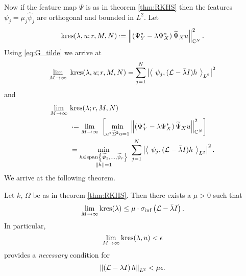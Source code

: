 Now if the feature map $\Psi$ is as in theorem \ref{thm:RKHS} then the features 
$\psi_j = \mu_j \hat{\psi}_j$ are orthogonal and bounded in $L^2$. Let 
\begin{equation}
    \kres (\lambda, u; r, M, N) \defeq 
    \left\| \left( \YY^* - \lambda \YX^* \right) \tYX u \right\|_{\bbC^N}^2 . 
\end{equation}
Using \ref{eq:G_tilde} we arrive at
\begin{equation}
    \lim_{M \to \infty}\ \kres (\lambda, u; r, M, N) = 
    \sum_{j=1}^{N} \left| \left\langle\ 
    \psi_j, (\scrL - \bar{\lambda} I) h \ \right\rangle_{L^2} \right|^2 
\end{equation}
and 
\begin{align}
    \lim_{M \to \infty}\ &\kres (\lambda; r, M, N) \\
    &\defeq \lim_{M \to \infty}\ \left[ \min_{u^* \widetilde{ \Sigma }^2 u = 1} 
    \left\| \left( \YY^* - \lambda \YX^* \right) \tYX u \right\|_{\bbC^N}^2 
    \right]\label{eq:new_res_hat} \\
    &= \min_{\substack{
        h \in \spn \left\{ \widetilde{ \psi }_1, \ldots, \widetilde{ \psi }_r \right\} \\ 
        \left\| h \right\| = 1
    }}\ \sum_{j=1}^{N} \left| \left\langle\ 
        \psi_j, (\scrL - \bar{\lambda} I) h 
    \ \right\rangle_{L^2} \right|^2 . 
\end{align}
We arrive at the following theorem. 

\begin{theorem}
    Let $k$, $\Omega$ be as in theorem \ref{thm:RKHS}. Then there exists a $\mu > 0$ such 
    that
    \begin{equation}
        \lim_{M \to \infty} \text{kres} (\lambda) \leq 
        \mu \cdot \sigma_{\inf} \left( \mathcal{L} - \bar{\lambda} I \right) . 
    \end{equation}
    In particular, 
    \begin{equation}
        \lim_{M \to \infty} \text{kres} (\lambda, u) < \epsilon
    \end{equation}
    provides a \emph{necessary} condition for 
    \begin{equation}
        \left\| \left( \mathcal{L} - \lambda I \right) h \right\|_{L^2} < \mu \epsilon . 
    \end{equation}
\end{theorem}

